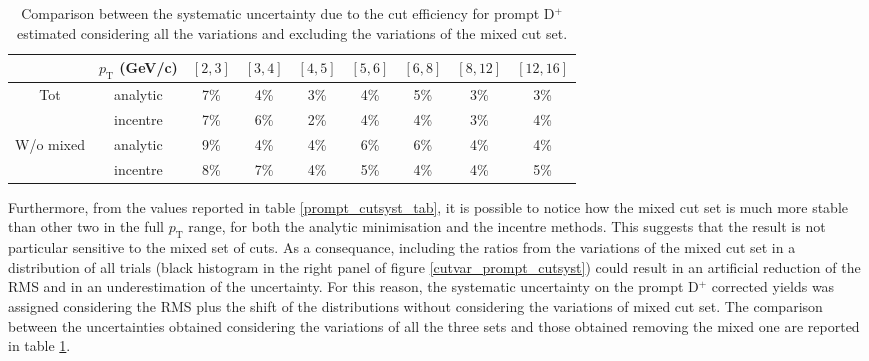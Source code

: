\documentclass[b5paper,10pt,twoside,oldstyle,classica]{toptesi}
\newcommand{\pt}{p_\text{T}}
\begin{document}
\begin{table}[tb]
\centering 
\begin{center} %
\renewcommand\arraystretch{1.2} 
\fontsize{9}{11}\selectfont
\begin{tabular}{|c|c|c|c|c|c|c|c|c|}
\cline{2-9}
\multicolumn{1}{c|}{} & $\pt$ (GeV/c) & $[2,3]$ & $[3,4]$ & $[4,5]$ & $[5,6]$ & $[6,8]$ & $[8,12]$ & $[12,16]$\\
\hline
\multirow{2}{*}{Tot} & analytic & 7\% & 4\% & 3\% & 4\% & 5\% & 3\% & 3\%\\
& incentre & 7\% & 6\% & 2\% & 4\% & 4\% & 3\% & 4\%\\
\hline
\multirow{2}{*}{W/o mixed} & analytic & 9\% & 4\% & 4\% & 6\% & 6\% & 4\% & 4\%\\
& incentre & 8\% & 7\% & 4\% & 5\% & 4\% & 4\% & 5\%\\
\hline
\end{tabular} 
\caption{Comparison between the systematic uncertainty due to the cut efficiency for prompt D$^+$ estimated considering all the variations and excluding the variations of the mixed cut set.}
\label{cutvar_prompt_syst_comp_tab}
\end{center} 
\end{table} 
Furthermore, from the values reported in table \ref{prompt_cutsyst_tab}, it is possible to notice how the mixed cut set is much more stable than other two in the full $\pt$ range, for both the analytic minimisation and the incentre methods. This suggests that the result is not particular sensitive to the mixed set of cuts. As a consequance, including the ratios from the variations of the mixed cut set in a distribution of all trials (black histogram in the right panel of figure \ref{cutvar_prompt_cutsyst}) could result in an artificial reduction of the RMS and in an underestimation of the uncertainty. For this reason, the systematic uncertainty on the prompt D$^+$ corrected yields was assigned considering the RMS plus the shift of the distributions without considering the variations of mixed cut set.  The comparison between the uncertainties obtained considering the variations of all the three sets and those obtained removing the mixed one are reported in table \ref{cutvar_prompt_syst_comp_tab}.    
\end{document}
